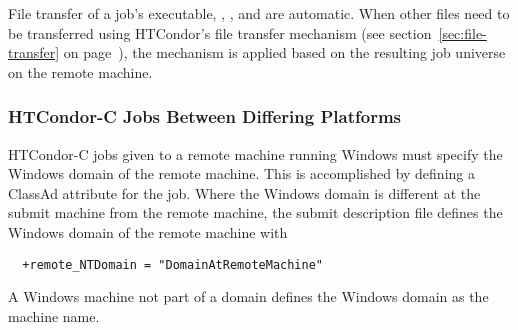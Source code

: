 File transfer of a job's executable, , , and
 are automatic.
When other files need to be transferred using HTCondor's file transfer
mechanism
(see section~\ref{sec:file-transfer} on page~\pageref{sec:file-transfer}),
the mechanism is applied based on the resulting job universe on the
remote machine.


\subsubsection{\label{sec:HTCondor-C-CrossPlatform}
HTCondor-C Jobs Between Differing Platforms}

HTCondor-C jobs given to a remote machine running Windows
must specify the Windows domain of the remote machine.
This is accomplished by defining a ClassAd attribute for the job.
Where the Windows domain is different at the submit machine
from the remote machine, the submit description file 
defines the Windows domain of the remote machine with
\begin{verbatim}
  +remote_NTDomain = "DomainAtRemoteMachine"
\end{verbatim}

A Windows machine not part of a domain
defines the Windows domain as the machine name.

%




